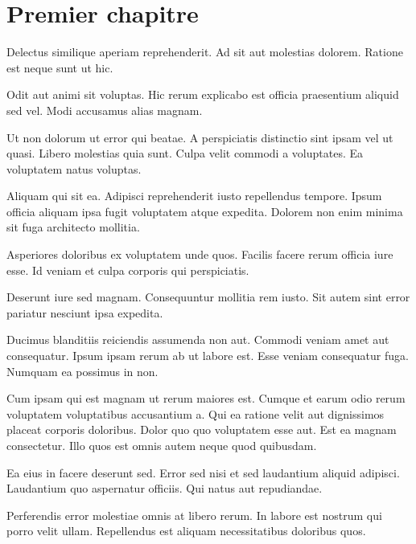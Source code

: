 \chapter{Premier chapitre}


Delectus similique aperiam reprehenderit. Ad sit aut molestias dolorem. Ratione est neque sunt ut hic.

Odit aut animi sit voluptas. Hic rerum explicabo est officia praesentium aliquid sed vel. Modi accusamus alias magnam.

Ut non dolorum ut error qui beatae. A perspiciatis distinctio sint ipsam vel ut quasi. Libero molestias quia sunt. Culpa velit commodi a voluptates. Ea voluptatem natus voluptas.

Aliquam qui sit ea. Adipisci reprehenderit iusto repellendus tempore. Ipsum officia aliquam ipsa fugit voluptatem atque expedita. Dolorem non enim minima sit fuga architecto mollitia.

Asperiores doloribus ex voluptatem unde quos. Facilis facere rerum officia iure esse. Id veniam et culpa corporis qui perspiciatis.

Deserunt iure sed magnam. Consequuntur mollitia rem iusto. Sit autem sint error pariatur nesciunt ipsa expedita.

Ducimus blanditiis reiciendis assumenda non aut. Commodi veniam amet aut consequatur. Ipsum ipsam rerum ab ut labore est. Esse veniam consequatur fuga. Numquam ea possimus in non.

Cum ipsam qui est magnam ut rerum maiores est. Cumque et earum odio rerum voluptatem voluptatibus accusantium a. Qui ea ratione velit aut dignissimos placeat corporis doloribus. Dolor quo quo voluptatem esse aut. Est ea magnam consectetur. Illo quos est omnis autem neque quod quibusdam.

Ea eius in facere deserunt sed. Error sed nisi et sed laudantium aliquid adipisci. Laudantium quo aspernatur officiis. Qui natus aut repudiandae.

Perferendis error molestiae omnis at libero rerum. In labore est nostrum qui porro velit ullam. Repellendus est aliquam necessitatibus doloribus quos.
